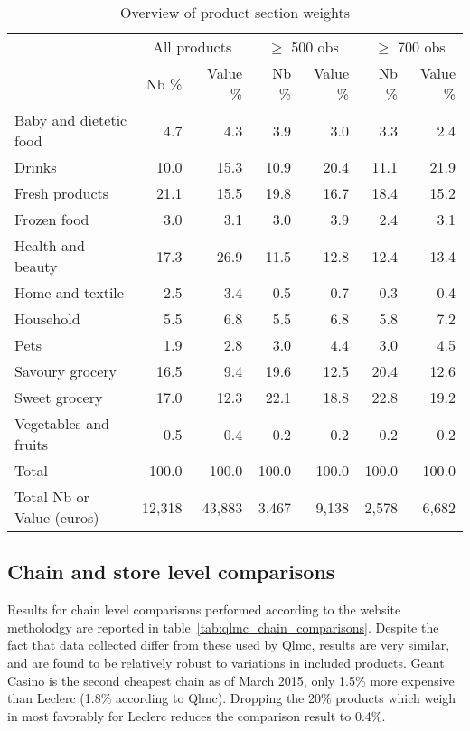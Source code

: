 \documentclass[english]{article}
\begin{document}
\begin{table}[H]
\renewcommand{\arraystretch}{0.7}%
\caption{Overview of product section weights}\label{tab:qlmc_sections}
\small
\begin{tabular}{lrr|rr|rr}
\toprule
\toprule
& \multicolumn{2}{c}{All products} & \multicolumn{2}{c|}{$\ge$ 500 obs} & \multicolumn{2}{c|}{$\ge$ 700 obs} \\
& Nb \% & Value \% & Nb \% & Value \% & Nb \% & Value \% \\
\midrule
    Baby and dietetic food & 4.7   & 4.3   & 3.9   & 3.0   & 3.3   & 2.4 \\
    Drinks & 10.0  & 15.3  & 10.9  & 20.4  & 11.1  & 21.9 \\
    Fresh products & 21.1  & 15.5  & 19.8  & 16.7  & 18.4  & 15.2 \\
    Frozen food & 3.0   & 3.1   & 3.0   & 3.9   & 2.4   & 3.1 \\
    Health and beauty & 17.3  & 26.9  & 11.5  & 12.8  & 12.4  & 13.4 \\
    Home and textile & 2.5   & 3.4   & 0.5   & 0.7   & 0.3   & 0.4 \\
    Household & 5.5   & 6.8   & 5.5   & 6.8   & 5.8   & 7.2 \\
    Pets  & 1.9   & 2.8   & 3.0   & 4.4   & 3.0   & 4.5 \\
    Savoury grocery & 16.5  & 9.4   & 19.6  & 12.5  & 20.4  & 12.6 \\
    Sweet grocery & 17.0  & 12.3  & 22.1  & 18.8  & 22.8  & 19.2 \\
    Vegetables and fruits & 0.5   & 0.4   & 0.2   & 0.2   & 0.2   & 0.2 \\
\midrule
    Total & 100.0 & 100.0 & 100.0 & 100.0 & 100.0 & 100.0 \\
    Total Nb or Value (euros) & 12,318 & 43,883 & 3,467 & 9,138 & 2,578 & 6,682 \\
\bottomrule
\bottomrule
\end{tabular}
\end{table}

\subsection{Chain and store level comparisons}

Results for chain level comparisons performed according to the website metholodgy are reported in table~\ref{tab:qlmc_chain_comparisons}. Despite the fact that data collected differ from these used by Qlmc, results are very similar, and are found to be relatively robust to variations in included products. Geant Casino is the second cheapest chain as of March 2015, only 1.5\% more expensive than Leclerc (1.8\% according to Qlmc). Dropping the 20\% products which weigh in most favorably for Leclerc reduces the comparison result to 0.4\%.
\end{document}
